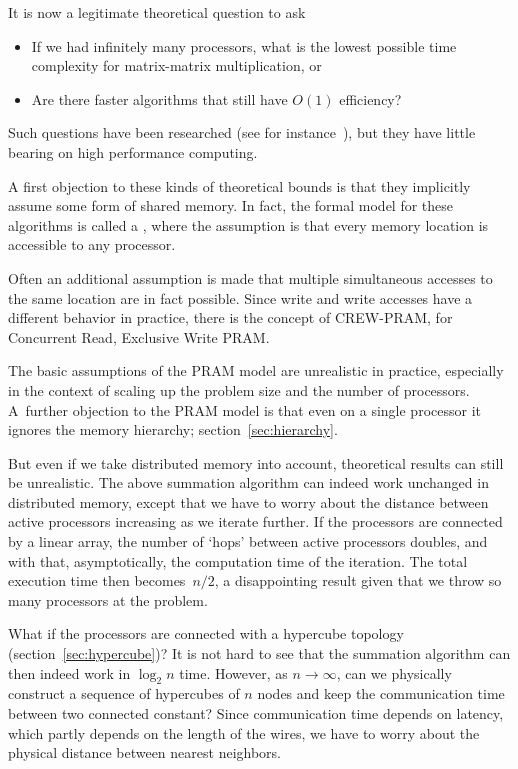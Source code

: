 It is now a legitimate theoretical question to ask
\begin{itemize}
\item If we had infinitely many processors, what is the lowest
  possible time complexity for matrix-matrix multiplication, or
\item Are there faster algorithms that still have $O(1)$ efficiency?
\end{itemize}
Such questions have been researched (see for
instance~\cite{He:surveyparallel}), but they have little bearing on
high performance computing. 

A first objection to these kinds of theoretical bounds is that they
implicitly assume some form of shared memory. In fact, the formal
model for these algorithms is called a , where the
assumption is that every memory location is accessible to any
processor.

Often an additional assumption is made that multiple simultaneous
accesses to the same location are in fact possible.
Since write and write accesses have a different behavior
in practice, there is the concept of
CREW-PRAM, for Concurrent Read, Exclusive Write PRAM.

The basic assumptions of the PRAM model are
unrealistic in practice, especially in the context of scaling up the
problem size and the number of processors. A~further objection to the
\ac{PRAM} model is that even on a single processor it ignores the
memory hierarchy; section~\ref{sec:hierarchy}.

But even if we take distributed memory into account, theoretical
results can still be unrealistic. The above summation algorithm can
indeed work unchanged in distributed memory, except that we have to
worry about the distance between active processors increasing as we
iterate further. If the processors are connected by a linear array,
the number of `hops' between active processors doubles, and with that,
asymptotically, the computation time of the iteration. The total
execution time then becomes~$n/2$, a disappointing result given that
we throw so many processors at the problem. 

What if the processors are
connected with a hypercube topology (section~\ref{sec:hypercube})?
It is not hard to see that the
summation algorithm can then indeed work in $\log_2n$ time. However,
as $n\rightarrow\infty$,
can we physically construct a sequence of hypercubes of $n$ nodes
and keep the communication time between two connected constant? Since
communication time depends on latency, which partly depends on the
length of the wires, we have to worry about the physical distance
between nearest neighbors.

